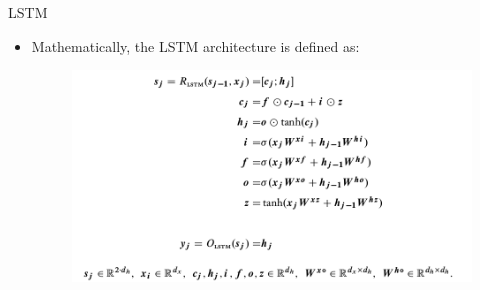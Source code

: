 \documentclass[handout]{beamer}
\begin{document}
\begin{frame}{LSTM}
\begin{scriptsize}

\begin{itemize}
\item Mathematically, the LSTM architecture is defined as:
  \begin{figure}[h]
        	\includegraphics[scale = 0.35]{pics/LSTMform.png}
        \end{figure}
\end{itemize}
\end{scriptsize}
\end{frame}
\end{document}
